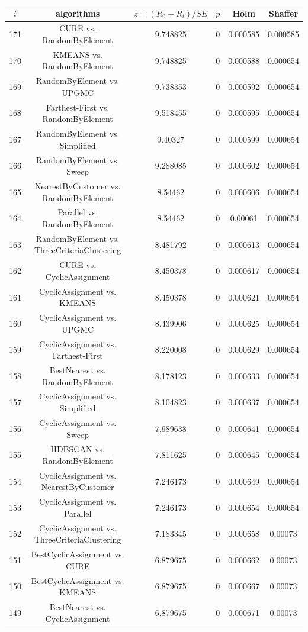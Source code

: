\documentclass[a4paper,10pt]{article}
\begin{document}
\begin{landscape}
\begin{table}[!htp]
\centering\scriptsize
\begin{tabular}{cccccc}
$i$&algorithms&$z=(R_0 - R_i)/SE$&$p$&Holm&Shaffer\\
\hline171&CURE vs. RandomByElement&9.748825&0&0.000585&0.000585\\
170&KMEANS vs. RandomByElement&9.748825&0&0.000588&0.000654\\
169&RandomByElement vs. UPGMC&9.738353&0&0.000592&0.000654\\
168&Farthest-First vs. RandomByElement&9.518455&0&0.000595&0.000654\\
167&RandomByElement vs. Simplified&9.40327&0&0.000599&0.000654\\
166&RandomByElement vs. Sweep&9.288085&0&0.000602&0.000654\\
165&NearestByCustomer vs. RandomByElement&8.54462&0&0.000606&0.000654\\
164&Parallel vs. RandomByElement&8.54462&0&0.00061&0.000654\\
163&RandomByElement vs. ThreeCriteriaClustering&8.481792&0&0.000613&0.000654\\
162&CURE vs. CyclicAssignment&8.450378&0&0.000617&0.000654\\
161&CyclicAssignment vs. KMEANS&8.450378&0&0.000621&0.000654\\
160&CyclicAssignment vs. UPGMC&8.439906&0&0.000625&0.000654\\
159&CyclicAssignment vs. Farthest-First&8.220008&0&0.000629&0.000654\\
158&BestNearest vs. RandomByElement&8.178123&0&0.000633&0.000654\\
157&CyclicAssignment vs. Simplified&8.104823&0&0.000637&0.000654\\
156&CyclicAssignment vs. Sweep&7.989638&0&0.000641&0.000654\\
155&HDBSCAN vs. RandomByElement&7.811625&0&0.000645&0.000654\\
154&CyclicAssignment vs. NearestByCustomer&7.246173&0&0.000649&0.000654\\
153&CyclicAssignment vs. Parallel&7.246173&0&0.000654&0.000654\\
152&CyclicAssignment vs. ThreeCriteriaClustering&7.183345&0&0.000658&0.00073\\
151&BestCyclicAssignment vs. CURE&6.879675&0&0.000662&0.00073\\
150&BestCyclicAssignment vs. KMEANS&6.879675&0&0.000667&0.00073\\
149&BestNearest vs. CyclicAssignment&6.879675&0&0.000671&0.00073\\

\end{tabular}
\end{table}
\end{landscape}
\end{document}

